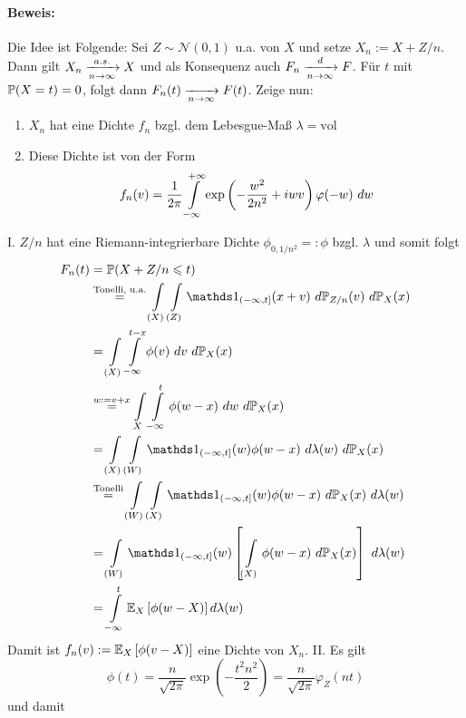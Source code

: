 \documentclass[11pt]{report}
\begin{document}
\paragraph{Beweis:} Die Idee ist Folgende: \newline
Sei $Z\sim\mathcal{N}(0,1)$ u.a. von $X$ und setze $X_n:=X+Z/n$. Dann gilt $X_n\nto{a.s.}{n\to\infty}X$ und als Konsequenz auch $F_n\nto{d}{n\to\infty}F$. F\"ur $t$ mit $\mathbb{P}(X=t)=0$, folgt dann $F_n(t)\nto{}{n\to\infty}F(t)$. Zeige nun: 
\begin{enumerate}[label=\Roman*.]
    \item $X_n$ hat eine Dichte $f_n$ bzgl. dem Lebesgue-Ma\ss{} $\lambda=\text{vol}$
    \item Diese Dichte ist von der Form 
    $$f_n(v)=\dfrac{1}{2\pi}\int\displaylimits_{-\infty}^{+\infty}\exp\left(-\dfrac{w^2}{2n^2}+iwv\right)\varphi(-w)\ dw$$
\end{enumerate}
\vspace{1ex}
I. $Z/n$ hat eine Riemann-integrierbare Dichte $\phi_{0,1/n^2}=:\phi$ bzgl. $\lambda$ und somit folgt
\begin{align*}
    F_n(t)&=\Pp(X+Z/n\leq t)\\
    &\overset{\text{Tonelli, u.a.}}{=}\int\displaylimits_{(X)}\int\displaylimits_{(Z)}\ind{(-\infty,t]}(x+v)\ d\Pp_{Z/n}(v)\ d\Pp_X(x) \\
    &=\int\displaylimits_{(X)}\int\displaylimits_{-\infty}^{t-x}\phi(v)\ dv\ d\Pp_X(x) \\
    &\overset{w:=v+x}{=}\int\displaylimits_{X}\int\displaylimits_{-\infty}^t \phi(w-x)\ dw\ d\Pp_X(x) \\
    &=\int\displaylimits_{(X)}\int\displaylimits_{(W)}\ind{(-\infty,t]}(w)\phi(w-x)\ d\lambda(w)\ d\Pp_X(x) \\
    &\overset{\text{Tonelli}}{=}\int\displaylimits_{(W)}\int\displaylimits_{(X)}\ind{(-\infty,t]}(w)\phi(w-x)\ d\Pp_X(x)\ d\lambda(w) \\
    &=\int\displaylimits_{(W)}\ind{(-\infty,t]}(w)\left[\int\displaylimits_{(X)}\phi(w-x)\ d\Pp_X(x)\right]\ d\lambda(w) \\
    &=\int\displaylimits_{-\infty}^t \E_X\left[\phi(w-X)\right]d\lambda(w)
\end{align*}
Damit ist $f_n(v):=\mathbb{E}_X\left[\phi(v-X)\right]$ eine Dichte von $X_n$.\newline\newline
II. Es gilt 
$$\phi(t)=\dfrac{n}{\sqrt{2\pi}}\exp\left(-\dfrac{t^2n^2}{2}\right)=\dfrac{n}{\sqrt{2\pi}}\varphi_Z(nt)$$
und damit 
\end{document}

